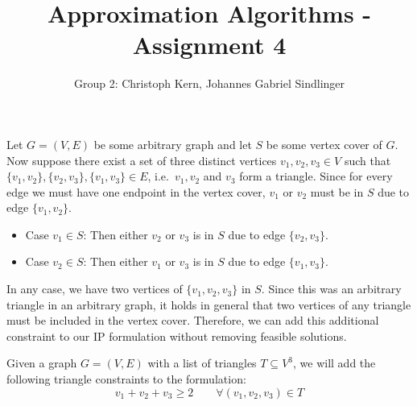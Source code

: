 \documentclass{article}
\title{Approximation Algorithms - Assignment 4}
\author{Group 2: Christoph Kern, Johannes Gabriel Sindlinger}
\begin{document}
\maketitle

\noindent{}
\vspace{1em}

Let $G=(V,E)$ be some arbitrary graph and let $S$ be some vertex cover of $G$. Now suppose there exist a set of three distinct vertices $v_1, v_2, v_3 \in V$ such that $\{v_1, v_2\}, \{v_2, v_3\}, \{v_1, v_3\} \in E$, i.e.~$v_1, v_2$ and $v_3$ form a triangle. Since for every edge we must have one endpoint in the vertex cover, $v_1$ or $v_2$ must be in $S$ due to edge $\{v_1, v_2\}$.
\begin{itemize}
    \item Case $v_1 \in S$: Then either $v_2$ or $v_3$ is in $S$ due to edge $\{v_2, v_3\}$. 
    \item Case $v_2 \in S$: Then either $v_1$ or $v_3$ is in $S$ due to edge $\{v_1, v_3\}$. 
\end{itemize}

In any case, we have two vertices of $\{v_1, v_2, v_3\}$ in $S$. Since this was an arbitrary triangle in an arbitrary graph, it holds in general that two vertices of any triangle must be included in the vertex cover. Therefore, we can add this additional constraint to our IP formulation without removing feasible solutions.
\vspace{3em}

\noindent{}
\vspace{1em}

Given a graph $G=(V,E)$ with a list of triangles $T \subseteq V^3$, we will add the following triangle constraints to the formulation:
\[
    v_1 + v_2 + v_3 \ge 2\quad\quad\forall (v_1, v_2, v_3) \in T 
\]
\end{document}
